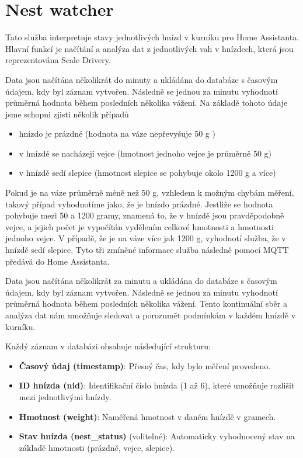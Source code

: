 \section{Nest watcher}\label{sec:nest-watcher}
Tato služba interpretuje stavy jednotlivých hnízd v kurníku pro Home Assistanta.
Hlavní funkcí je načítání a analýza dat z jednotlivých vah v hnízdech, která jsou reprezentována Scale Drivery.\newline


Data jsou načítána několikrát do minuty a ukládána do databáze s časovým údajem, kdy byl záznam vytvořen.
Následně se jednou za minutu vyhodnotí průměrná hodnota během posledních několika vážení.
Na základě tohoto údaje jsme schopni zjisti několik případů
\begin{itemize}
    \item hnízdo je prázdné (hodnota na váze nepřevyšuje 50 g )
    \item v hnízdě se nacházejí vejce (hmotnost jednoho vejce je průměrně 50 g)
    \item v hnízdě sedí slepice (hmotnost slepice se pohybuje okolo 1200 g a více)
\end{itemize}
Pokud je na váze průměrně méně než 50 g, vzhledem k možným chybám měření, takový případ vyhodnotíme jako, že je hnízdo prázdné.
Jestliže se hodnota pohybuje mezi 50 a 1200 gramy, znamená to, že v hnízdě jsou pravděpodobně vejce, a jejich počet je vypočítán vydělením celkové hmotnosti a hmotnosti jednoho vejce.
V případě, že je na váze více jak 1200 g, vyhodnotí služba, že v hnízdě sedí slepice.
Tyto tři zmíněné informace služba následně pomocí MQTT předává do Home Assistanta.


Data jsou načítána několikrát za minutu a ukládána do databáze s časovým údajem, kdy byl záznam vytvořen. Následně se jednou za minutu vyhodnotí průměrná hodnota během posledních několika vážení. Tento kontinuální sběr a analýza dat nám umožňuje sledovat a porozumět podmínkám v každém hnízdě v kurníku.

Každý záznam v databázi obsahuje následující strukturu:
\begin{itemize}
    \item \textbf{Časový údaj (timestamp)}: Přesný čas, kdy bylo měření provedeno.
    \item \textbf{ID hnízda (nid)}: Identifikační číslo hnízda (1 až 6), které umožňuje rozlišit mezi jednotlivými hnízdy.
    \item \textbf{Hmotnost (weight)}: Naměřená hmotnost v daném hnízdě v gramech.
    \item \textbf{Stav hnízda (nest\_status)} (volitelné): Automaticky vyhodnocený stav na základě hmotnosti (prázdné, vejce, slepice).
\end{itemize}


